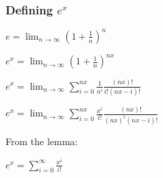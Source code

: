 \subsubsection{Defining \(e^x\)}

\(e=\lim_{n\rightarrow \infty }(1+\frac{1}{n})^{n}\)

\(e^x=\lim_{n\rightarrow \infty }(1+\frac{1}{n})^{nx}\)

\(e^x=\lim_{n\rightarrow \infty }\sum^{nx}_{i=0} \frac{1}{n^i} \frac{(nx)!}{i!(nx-i)!}\)

\(e^x=\lim_{n\rightarrow \infty }\sum^{nx}_{i=0} \frac{x^i}{i!} \frac{(nx)!}{(nx)^i(nx-i)!}\)

From the lemma:

\(e^x=\sum^{\infty }_{i=0} \frac{x^i}{i!}\)

